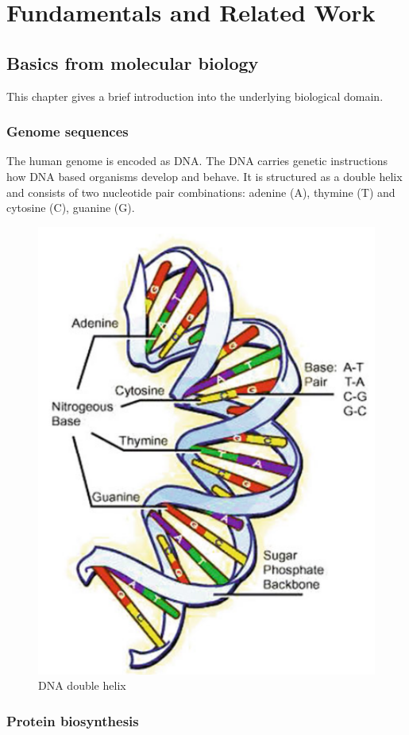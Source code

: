 \section{Fundamentals and Related Work} \label{fundamentals}

\subsection{Basics from molecular biology} \label{fundamentalsA0}

This chapter gives a brief introduction into the underlying biological domain.

\subsubsection{Genome sequences} \label{fundamentalsA0a}

The human genome is encoded as \ac{DNA}. The \ac{DNA} carries genetic instructions how \ac{DNA} based organisms develop and behave. It is structured as a double helix and consists of two nucleotide pair combinations: adenine (A), thymine (T) and cytosine (C), guanine (G). \cite[p. 8]{10.5555/1965281}

\begin{figure}[ht]
	\centering
	\includegraphics[width=0.5\linewidth]{figures/dnaDoubleHelix.png}
	\caption{\ac{DNA} double helix \cite[p. 8]{10.5555/1965281}}
	\label{dna_double_helix}
\end{figure}

\subsubsection{Protein biosynthesis} \label{fundamentalsA0b}

